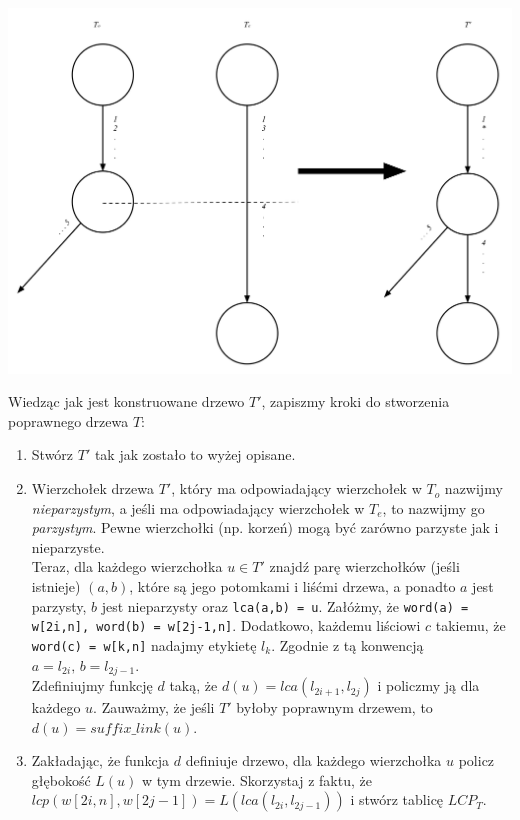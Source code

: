 \begin{center}
 \includegraphics[scale=0.1,keepaspectratio=true]{graphics/farach-suffix-tree-overmerging.jpg}
\end{center}


Wiedząc jak jest konstruowane drzewo $T'$, zapiszmy kroki do stworzenia poprawnego drzewa $T$:
\begin{enumerate}
 \item Stwórz $T'$ tak jak zostało to wyżej opisane.
 \item Wierzchołek drzewa $T'$, który ma odpowiadający wierzchołek w $T_o$ nazwijmy \textit{nieparzystym}, a jeśli ma odpowiadający wierzchołek w $T_e$, to nazwijmy go \textit{parzystym}. Pewne wierzchołki (np. korzeń) mogą być zarówno parzyste jak i nieparzyste.\\
 Teraz, dla każdego wierzchołka $u \in T'$ znajdź parę wierzchołków (jeśli istnieje) $(a,b)$, które są jego potomkami i liśćmi drzewa, a ponadto $a$ jest parzysty, $b$ jest nieparzysty oraz \verb|lca(a,b) = u|. Załóżmy, że \verb|word(a) = w[2i,n], word(b) = w[2j-1,n]|. Dodatkowo, każdemu liściowi $c$ takiemu, że \verb|word(c) = w[k,n]| nadajmy etykietę $l_k$. Zgodnie z tą konwencją $a = l_{2i}, \, b = l_{2j - 1}$.
 \\
 Zdefiniujmy funkcję $d$ taką, że $d(u) = lca(l_{2i+1}, l_{2j})$ i policzmy ją dla każdego $u$. Zauważmy, że jeśli $T'$ byłoby poprawnym drzewem, to $d(u) = suffix
\_link(u)$.
 \item Zakładając, że funkcja $d$ definiuje drzewo, dla każdego wierzchołka $u$ policz głębokość $L(u)$ w tym drzewie. Skorzystaj z faktu, że $lcp(w[2i,n], w[2j-1]) = L(lca(l_{2i}, l_{2j-1}))$ i stwórz tablicę $LCP_T$. 
\end{enumerate}
